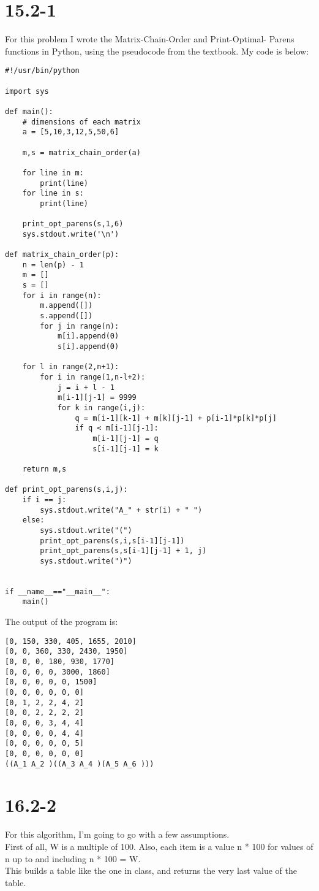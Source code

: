 \documentclass{article}
\begin{document}
\section*{15.2-1}
For this problem I wrote the Matrix-Chain-Order and Print-Optimal-
Parens functions in Python, using the pseudocode from the textbook.
My code is below:
\begin{verbatim}
#!/usr/bin/python

import sys

def main():
    # dimensions of each matrix
    a = [5,10,3,12,5,50,6]

    m,s = matrix_chain_order(a)

    for line in m:
        print(line)
    for line in s:
        print(line)

    print_opt_parens(s,1,6)
    sys.stdout.write('\n')

def matrix_chain_order(p):
    n = len(p) - 1
    m = []
    s = []
    for i in range(n):
        m.append([])
        s.append([])
        for j in range(n):
            m[i].append(0)
            s[i].append(0)
    
    for l in range(2,n+1):
        for i in range(1,n-l+2):
            j = i + l - 1
            m[i-1][j-1] = 9999
            for k in range(i,j):
                q = m[i-1][k-1] + m[k][j-1] + p[i-1]*p[k]*p[j]
                if q < m[i-1][j-1]:
                    m[i-1][j-1] = q
                    s[i-1][j-1] = k
            
    return m,s

def print_opt_parens(s,i,j):
    if i == j:
        sys.stdout.write("A_" + str(i) + " ")
    else:
        sys.stdout.write("(")
        print_opt_parens(s,i,s[i-1][j-1])
        print_opt_parens(s,s[i-1][j-1] + 1, j)
        sys.stdout.write(")")


if __name__=="__main__":
    main()
\end{verbatim}
The output of the program is:
\begin{verbatim}
[0, 150, 330, 405, 1655, 2010]
[0, 0, 360, 330, 2430, 1950]
[0, 0, 0, 180, 930, 1770]
[0, 0, 0, 0, 3000, 1860]
[0, 0, 0, 0, 0, 1500]
[0, 0, 0, 0, 0, 0]
[0, 1, 2, 2, 4, 2]
[0, 0, 2, 2, 2, 2]
[0, 0, 0, 3, 4, 4]
[0, 0, 0, 0, 4, 4]
[0, 0, 0, 0, 0, 5]
[0, 0, 0, 0, 0, 0]
((A_1 A_2 )((A_3 A_4 )(A_5 A_6 )))
\end{verbatim}

\section*{16.2-2}
For this algorithm, I'm going to go with a few assumptions.\\
First of all, W is a multiple of 100. Also, each item is a value
n * 100 for values of n up to and including n * 100 = W.\\
This builds a table like the one in class, and returns the very
last value of the table.\\
\end{document}
